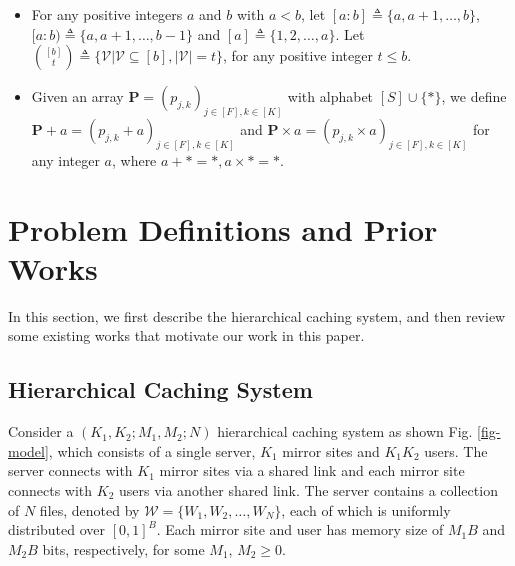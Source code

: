 \documentclass[onecolumn,10pt]{IEEEtran}
\theoremstyle{mythm}
\begin{document}
\begin{itemize}
  \item For any positive integers $a$ and $b$ with $a<b$, let $[a:b]\triangleq\{a,a+1,\ldots,b\}$, $[a:b)\triangleq\{a,a+1,\ldots,b-1\}$ and $[a]\triangleq\{1,2,\ldots,a\}$. Let $\binom{[b]}{t}\triangleq \{\mathcal{V}|\mathcal{V}\subseteq [b],|\mathcal{V}|=t\}$, for any positive integer $t\leq b$.
  \item Given an array $\mathbf{P}=(p_{j,k})_{j\in[F], k\in[K]}$ with alphabet $[S]\cup \{*\}$, we define $\mathbf{P}+a=(p_{j,k}+a)_{j\in[F], k\in[K]}$ and $\mathbf{P}\times a=(p_{j,k}\times a)_{j\in[F], k\in[K]}$  for any integer $a$, where $a+*=*, a\times *=*$.
\end{itemize}


\section{Problem Definitions and Prior Works}
\label{sec:System}
     In this section, we first describe the hierarchical   caching system, and then review some   existing works   that motivate  our work in this paper.
\subsection{Hierarchical Caching System}
\label{subsec:hccs}
Consider  a $(K_1,K_2;M_1,M_2;N)$  hierarchical caching system as shown  Fig. \ref{fig-model}, which  consists of a single  server, $K_1$ mirror sites and $K_1K_2$ users. The server connects with  $K_1$ mirror sites via a shared link and each mirror site connects with $K_2$ users via another shared link. The server contains a collection of $N$ files, denoted by $\mathcal{W} = \{W_1, W_2,\ldots,W_{N}\}$, each of which is uniformly distributed over $[0,1]^B$. Each mirror site and user  has memory size of $M_1B$   and $M_2B$ bits, respectively, for some $M_1$, $M_2\geq 0$.
\end{document}

